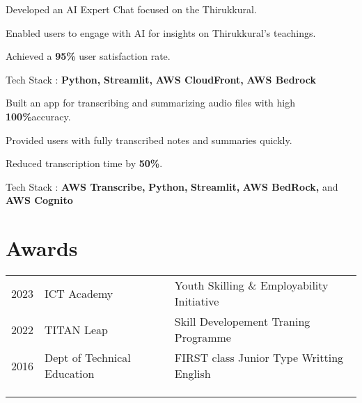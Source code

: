 \documentclass[]{deedy-resume-openfont}
\begin{document}
\begin{minipage}[t]{0.66\textwidth}
\begin{tightemize}
\item Developed an AI Expert Chat focused on the Thirukkural. 
\item Enabled users to engage with AI for insights on Thirukkural's teachings.
\item Achieved a \textbf{95\%} user satisfaction rate.
\item Tech Stack : \textbf{Python, } \textbf{Streamlit, } \textbf{AWS CloudFront, } \textbf{AWS Bedrock}
\end{tightemize}
\sectionsep

\begin{tightemize}
\item Built an app for transcribing and summarizing audio files with high \textbf{100\%}accuracy.
\item Provided users with fully transcribed notes and summaries quickly.
\item Reduced transcription time by \textbf{50\%}.
\item Tech Stack :   \textbf{AWS Transcribe, } \textbf{Python, } \textbf{Streamlit, } \textbf{AWS BedRock, } and \textbf{AWS Cognito}
\end{tightemize}
\sectionsep


\section{Awards} 
\begin{tabular}{rll}
2023& ICT Academy& Youth Skilling \& Employability Initiative\\
2022& TITAN Leap& Skill Developement Traning Programme\\
2016& Dept of Technical Education& FIRST class Junior Type Writting English\\
& & \\
& & \\
& & \\
\end{tabular}
\sectionsep





\end{minipage} 
\end{document}
